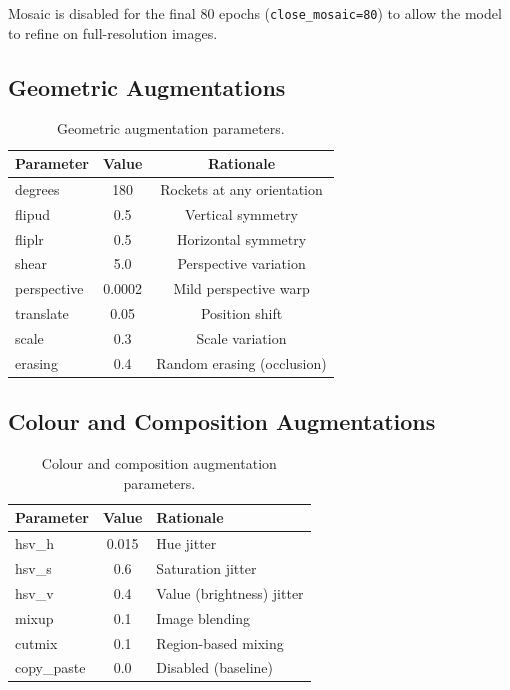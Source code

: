\documentclass[12pt, titlepage]{article}
\begin{document}
Mosaic is disabled for the final 80 epochs (\texttt{close\_mosaic=80}) to allow
the model to refine on full-resolution images.

\subsection{Geometric Augmentations}

\begin{table}[h]
  \centering
  \caption{Geometric augmentation parameters.}
  \label{tab:geo_aug}
  \begin{tabular}{@{}lcc@{}}
    \toprule
    \textbf{Parameter} & \textbf{Value} & \textbf{Rationale}         \\
    \midrule
    degrees            & 180            & Rockets at any orientation \\
    flipud             & 0.5            & Vertical symmetry          \\
    fliplr             & 0.5            & Horizontal symmetry        \\
    shear              & 5.0            & Perspective variation      \\
    perspective        & 0.0002         & Mild perspective warp      \\
    translate          & 0.05           & Position shift             \\
    scale              & 0.3            & Scale variation            \\
    erasing            & 0.4            & Random erasing (occlusion) \\
    \bottomrule
  \end{tabular}
\end{table}

\subsection{Colour and Composition Augmentations}

\begin{table}[h]
  \centering
  \caption{Colour and composition augmentation parameters.}
  \label{tab:colour_aug}
  \begin{tabular}{@{}lcl@{}}
    \toprule
    \textbf{Parameter} & \textbf{Value} & \textbf{Rationale}        \\
    \midrule
    hsv\_h             & 0.015          & Hue jitter                \\
    hsv\_s             & 0.6            & Saturation jitter         \\
    hsv\_v             & 0.4            & Value (brightness) jitter \\
    mixup              & 0.1            & Image blending            \\
    cutmix             & 0.1            & Region-based mixing       \\
    copy\_paste        & 0.0            & Disabled (baseline)       \\
    \bottomrule
  \end{tabular}
\end{table}
\end{document}
